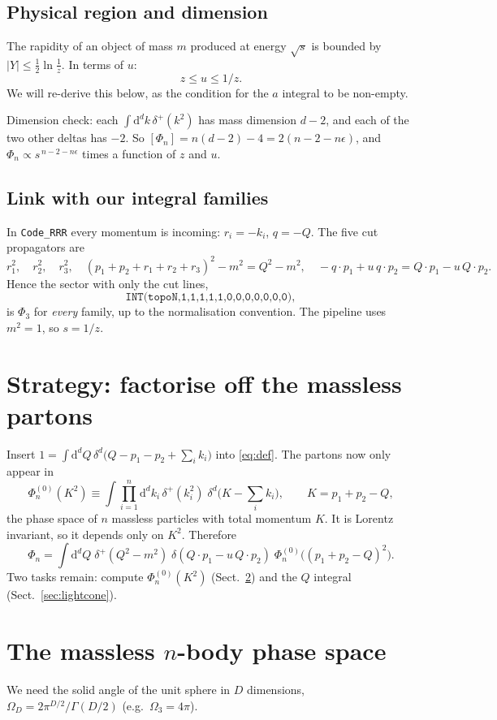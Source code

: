 \documentclass[11pt,a4paper]{article}
\newcommand{\ep}{\epsilon}
\newcommand{\dd}{\mathrm{d}}
\begin{document}
\subsection{Physical region and dimension}
The rapidity of an object of mass $m$ produced at energy $\sqrt s$ is bounded by $|Y|\le\frac12\ln\frac1z$. In
terms of $u$:
\[ z\le u\le 1/z . \]
We will re-derive this below, as the condition for the $a$ integral to be non-empty.

Dimension check: each $\int\dd^dk\,\delta^+(k^2)$ has mass dimension $d-2$, and each of the two other deltas
has $-2$. So $[\Phi_n]=n(d-2)-4=2(n-2-n\ep)$, and $\Phi_n\propto s^{\,n-2-n\ep}$ times a function of $z$ and $u$.

\subsection{Link with our integral families}
In \texttt{Code\_RRR} every momentum is incoming: $r_i=-k_i$, $q=-Q$. The five cut propagators are
\[
  r_1^2,\quad r_2^2,\quad r_3^2,\quad (p_1+p_2+r_1+r_2+r_3)^2-m^2=Q^2-m^2,\quad
  -q\cdot p_1+u\,q\cdot p_2=Q\cdot p_1-u\,Q\cdot p_2 .
\]
Hence the sector with only the cut lines,
\[\texttt{INT(topoN,1,1,1,1,1,0,0,0,0,0,0,0)},\]
is $\Phi_3$ for \emph{every} family, up to the normalisation convention. The pipeline uses $m^2=1$, so $s=1/z$.

\section{Strategy: factorise off the massless partons}
\label{sec:strategy}
Insert $1=\int\dd^dQ\,\delta^d\big(Q-p_1-p_2+\sum_ik_i\big)$ into \eqref{eq:def}. The partons now only appear in
\begin{equation}
  \Phi^{(0)}_n(K^2)\equiv\int\prod_{i=1}^n\dd^dk_i\,\delta^+(k_i^2)\;\delta^d\Big(K-\sum_ik_i\Big),
  \qquad K=p_1+p_2-Q,
\end{equation}
the phase space of $n$ massless particles with total momentum $K$. It is Lorentz invariant, so it depends only on
$K^2$. Therefore
\begin{equation}
  \Phi_n=\int\dd^dQ\;\delta^+(Q^2-m^2)\;\delta(Q\cdot p_1-u\,Q\cdot p_2)\;\Phi^{(0)}_n\big((p_1+p_2-Q)^2\big).
  \label{eq:fact}
\end{equation}
Two tasks remain: compute $\Phi^{(0)}_n(K^2)$ (Sect.~\ref{sec:massless}) and the $Q$ integral
(Sect.~\ref{sec:lightcone}).

\section{\texorpdfstring{The massless $n$-body phase space}{The massless n-body phase space}}
\label{sec:massless}
We need the solid angle of the unit sphere in $D$ dimensions, $\Omega_D=2\pi^{D/2}/\Gamma(D/2)$
(e.g.\ $\Omega_3=4\pi$).
\end{document}
